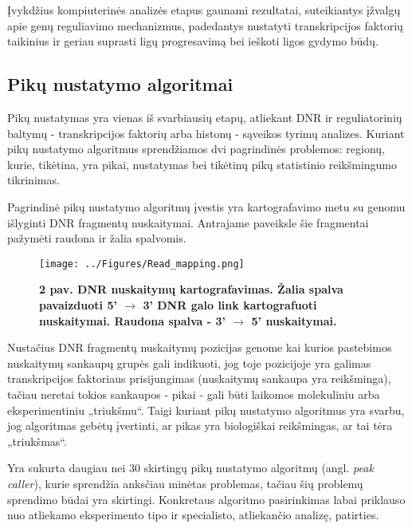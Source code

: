\documentclass[12pt]{article}
\begin{document}
Įvykdžius kompiuterinės analizės etapus gaunami rezultatai, suteikiantys
įžvalgų apie genų reguliavimo mechanizmus, padedantys nustatyti
transkripcijos faktorių taikinius ir geriau suprasti ligų progresavimą bei
ieškoti ligos gydymo būdų.

\newpage

\subsection{Pikų nustatymo algoritmai}
Pikų nustatymas yra vienas iš svarbiausių etapų, atliekant DNR ir reguliatorinių
baltymų - transkripcijos faktorių arba histonų - sąveikos tyrimų analizes.
Kuriant pikų nustatymo algoritmus sprendžiamos dvi pagrindinės problemos:
regionų, kurie, tikėtina, yra pikai, nustatymas bei tikėtinų pikų statistinio
reikšmingumo tikrinimas.

Pagrindinė pikų nustatymo algoritmų įvestis yra kartografavimo metu su genomu
išlyginti DNR fragmentų nuskaitymai. Antrajame paveiksle šie fragmentai pažymėti
raudona ir žalia spalvomis.

\begin{figure}[ht]
    \begin{center}
        \captionsetup{justification=centering}
        \texttt{[image: ../Figures/Read\_mapping.png]}
        \vspace{-1\baselineskip}
        \caption*{\small\textbf{2 pav. DNR nuskaitymų kartografavimas. Žalia
                                spalva pavaizduoti 5' \(\rightarrow\) 3' DNR
                                galo link kartografuoti nuskaitymai. Raudona
                                spalva - 3' \(\rightarrow\) 5' nuskaitymai.}}
    \end{center}
\end{figure}

Nustačius DNR fragmentų nuskaitymų pozicijas genome kai kurios pastebimos
nuskaitymų sankaupų grupės gali indikuoti, jog toje pozicijoje yra galimas
transkripcijos faktoriaus prisijungimas (nuskaitymų sankaupa yra reikšminga),
tačiau neretai tokios sankaupos - pikai - gali būti laikomos molekuliniu arba
eksperimentiniu „triukšmu“. Taigi kuriant pikų nustatymo algoritmus yra
svarbu, jog algoritmas gebėtų įvertinti, ar pikas yra biologiškai reikšmingas,
ar tai tėra „triukšmas“.

Yra sukurta daugiau nei 30 skirtingų pikų nustatymo algoritmų (angl.
\emph{peak caller}), kurie sprendžia anksčiau minėtas problemas,
tačiau šių problemų sprendimo būdai yra skirtingi. Konkretaus algoritmo
pasirinkimas labai priklauso nuo atliekamo eksperimento tipo ir specialisto,
atliekančio analizę, patirties\cite{ARTICLE13}.
\end{document}
